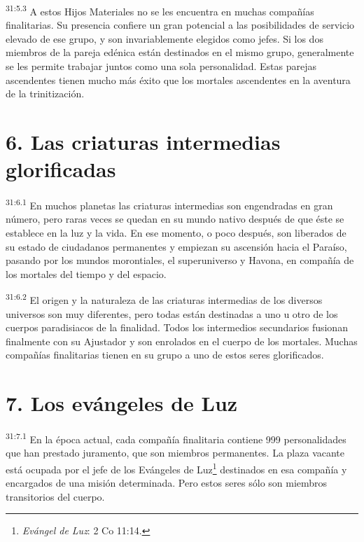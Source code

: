 \par
\textsuperscript{31:5.3} A estos Hijos Materiales no se les encuentra en muchas compañías finalitarias. Su presencia confiere un gran potencial a las posibilidades de servicio elevado de ese grupo, y son invariablemente elegidos como jefes. Si los dos miembros de la pareja edénica están destinados en el mismo grupo, generalmente se les permite trabajar juntos como una sola personalidad. Estas parejas ascendentes tienen mucho más éxito que los mortales ascendentes en la aventura de la trinitización.

\section*{6. Las criaturas intermedias glorificadas}
\par
\textsuperscript{31:6.1} En muchos planetas las criaturas intermedias son engendradas en gran número, pero raras veces se quedan en su mundo nativo después de que éste se establece en la luz y la vida. En ese momento, o poco después, son liberados de su estado de ciudadanos permanentes y empiezan su ascensión hacia el Paraíso, pasando por los mundos morontiales, el superuniverso y Havona, en compañía de los mortales del tiempo y del espacio.

\par
\textsuperscript{31:6.2} El origen y la naturaleza de las criaturas intermedias de los diversos universos son muy diferentes, pero todas están destinadas a uno u otro de los cuerpos paradisiacos de la finalidad. Todos los intermedios secundarios fusionan finalmente con su Ajustador y son enrolados en el cuerpo de los mortales. Muchas compañías finalitarias tienen en su grupo a uno de estos seres glorificados.

\section*{7. Los evángeles de Luz}
\par
\textsuperscript{31:7.1} En la época actual, cada compañía finalitaria contiene 999 personalidades que han prestado juramento, que son miembros permanentes. La plaza vacante está ocupada por el jefe de los Evángeles de Luz\footnote{\textit{Evángel de Luz}: 2 Co 11:14.} destinados en esa compañía y encargados de una misión determinada. Pero estos seres sólo son miembros transitorios del cuerpo.

